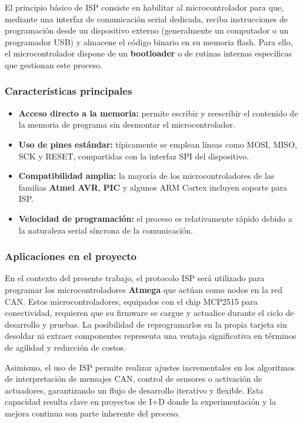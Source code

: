 El principio básico de ISP consiste en habilitar al microcontrolador para que, mediante una interfaz de comunicación serial dedicada, reciba instrucciones de programación desde un dispositivo externo (generalmente un computador o un programador USB) y almacene el código binario en su memoria flash. Para ello, el microcontrolador dispone de un \textbf{bootloader} o de rutinas internas específicas que gestionan este proceso.

\subsubsection*{Características principales}

\begin{itemize}
    \item \textbf{Acceso directo a la memoria:} permite escribir y reescribir el contenido de la memoria de programa sin desmontar el microcontrolador.
    \item \textbf{Uso de pines estándar:} típicamente se emplean líneas como MOSI, MISO, SCK y RESET, compartidas con la interfaz SPI del dispositivo.
    \item \textbf{Compatibilidad amplia:} la mayoría de los microcontroladores de las familias \textbf{Atmel AVR}, \textbf{PIC} y algunos ARM Cortex incluyen soporte para ISP.
    \item \textbf{Velocidad de programación:} el proceso es relativamente rápido debido a la naturaleza serial síncrona de la comunicación.
\end{itemize}

\subsubsection*{Aplicaciones en el proyecto}

En el contexto del presente trabajo, el protocolo ISP será utilizado para programar los microcontroladores \textbf{Atmega} que actúan como nodos en la red CAN. Estos microcontroladores, equipados con el chip MCP2515 para conectividad, requieren que su firmware se cargue y actualice durante el ciclo de desarrollo y pruebas. La posibilidad de reprogramarlos en la propia tarjeta sin desoldar ni extraer componentes representa una ventaja significativa en términos de agilidad y reducción de costos.

Asimismo, el uso de ISP permite realizar ajustes incrementales en los algoritmos de interpretación de mensajes CAN, control de sensores o activación de actuadores, garantizando un flujo de desarrollo iterativo y flexible. Esta capacidad resulta clave en proyectos de I+D donde la experimentación y la mejora continua son parte inherente del proceso.

